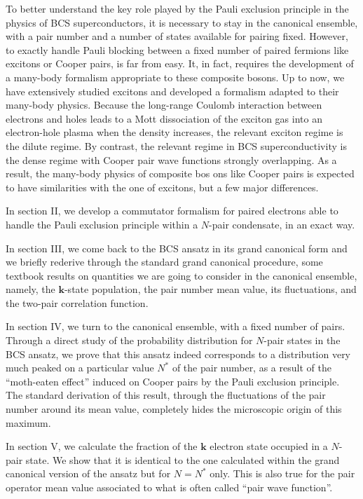 \documentclass[twocolumn,showpacs]{revtex4}
\def\v#1{\mathbf{#1}}
\begin{document}
To better understand the key role played by the Pauli exclusion principle in the physics of BCS superconductors, it is necessary to stay in the canonical ensemble, with a pair number and a number of states available for pairing fixed. However, to exactly handle Pauli blocking between a fixed number of paired fermions like excitons or Cooper pairs, is far from easy. It, in fact, requires the development of a many-body formalism appropriate to these composite bosons. Up to now, we have extensively studied excitons and developed a formalism adapted to their many-body physics. Because the long-range Coulomb interaction between electrons and holes leads to a Mott dissociation of the exciton gas  into an electron-hole plasma when the density increases, the relevant exciton regime is the dilute regime. By contrast, the relevant regime in BCS superconductivity is the dense regime with Cooper pair wave functions strongly overlapping. As a result, the many-body physics of composite bos
 ons like Cooper pairs is expected to have similarities with the one of excitons, but a few major differences.

In section II, we  develop a commutator formalism for paired electrons able to handle the Pauli exclusion principle within a $N$-pair condensate, in an exact way.

In section III, we come back to the BCS ansatz in its grand canonical form and we briefly rederive through the standard grand canonical procedure, some textbook results on quantities we are going to consider in the canonical ensemble, namely, the $\v k$-state population, the pair number mean value, its fluctuations, and the two-pair correlation function.

In section IV, we turn to the canonical ensemble, with a fixed number of pairs. Through a direct study of the probability distribution for $N$-pair states in the BCS ansatz,  we prove that this ansatz indeed corresponds to a distribution very much peaked on a particular value $N^\ast$ of the pair number, as a result of the ``moth-eaten effect'' induced on Cooper pairs by the Pauli exclusion principle. The standard derivation of this result, through the fluctuations of the pair number around its mean value, completely hides the microscopic origin of this maximum.

In section V, we calculate the fraction of the $\v k$ electron state occupied in a $N$-pair state. We show that it is identical to the one calculated within the grand canonical version of the ansatz but for $N=N^\ast$ only. This is also true for the pair operator mean value associated to what is often called ``pair wave function''.
\end{document}
